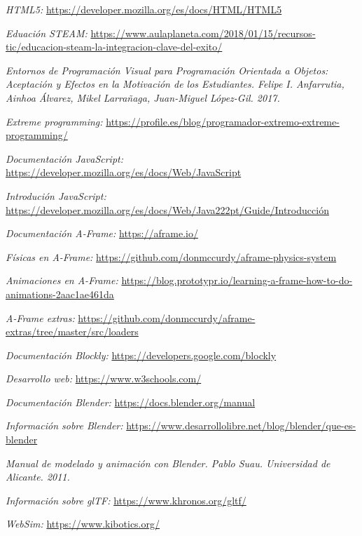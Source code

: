 \begin{thebibliography}{99}

    
    \textit{HTML5:}   \url{https://developer.mozilla.org/es/docs/HTML/HTML5}
    
    \textit{Eduación STEAM:}   \url{https://www.aulaplaneta.com/2018/01/15/recursos-tic/educacion-steam-la-integracion-clave-del-exito/}
    
    \textit{Entornos de Programación Visual para Programación Orientada a Objetos: Aceptación y Efectos en la Motivación de los Estudiantes. Felipe I. Anfarrutia, Ainhoa Álvarez, Mikel Larrañaga, Juan-Miguel López-Gil. 2017.}
    
    \textit{Extreme programming: }
    \url{https://profile.es/blog/programador-extremo-extreme-programming/}
    
    \textit{Documentación JavaScript: }
    \url{https://developer.mozilla.org/es/docs/Web/JavaScript}
    
    \textit{Introdución JavaScript: }
    \url{https://developer.mozilla.org/es/docs/Web/Java222pt/Guide/Introducción}
   
    \textit{Documentación A-Frame:}
    \url{https://aframe.io/}
    
    \textit{Físicas en A-Frame: }
    \url{https://github.com/donmccurdy/aframe-physics-system}
    
    \textit{Animaciones en A-Frame: }
    \url{https://blog.prototypr.io/learning-a-frame-how-to-do-animations-2aac1ae461da}
    
    \textit{A-Frame extras: }
    \url{https://github.com/donmccurdy/aframe-extras/tree/master/src/loaders}
    
    \textit{Documentación Blockly: }
    \url{https://developers.google.com/blockly}
    
    \textit{Desarrollo web: }
    \url{https://www.w3schools.com/}
    
    \textit{Documentación Blender: }
    \url{https://docs.blender.org/manual}
    
    \textit{Información sobre Blender: }
    \url{https://www.desarrollolibre.net/blog/blender/que-es-blender}
    
    \textit{Manual de modelado y animación con Blender. Pablo Suau. Universidad de Alicante. 2011.}
    
    \textit{Información sobre glTF: }
    \url{https://www.khronos.org/gltf/}
   
    \textit{WebSim:}  
    \url{https://www.kibotics.org/}
\end{thebibliography}